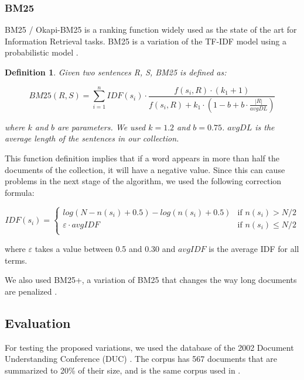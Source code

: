 \documentclass{llncs}
\newtheorem{definicion}{Definition}
\begin{document}
\subsubsection{BM25}
BM25 / Okapi-BM25 is a ranking function widely used as the state of the art for Information Retrieval tasks. BM25 is a variation of the TF-IDF model using a probabilistic model \cite{robertson}.

\begin{definicion}
Given two sentences R, S, BM25 is defined as:

\begin{equation}
BM25(R,S) = \sum_{i=1}^{n} IDF(s_i) \cdot \frac{f(s_i, R) \cdot (k_1 + 1)}{f(s_i, R) + k_1 \cdot (1 - b + b \cdot \frac{|R|}{avgDL})}
\end{equation}

where $k$ and $b$ are parameters. We used $k = 1.2$ and $b = 0.75$. $avgDL$ is the average length of the sentences in our collection.
\end{definicion}

This function definition implies that if a word appears in more than half the documents of the collection, it will have a negative value. Since this can cause problems in the next stage of the algorithm, we used the following correction formula:
                
\begin{equation}
 IDF(s_i) =
  \begin{cases}
       log(N - n(s_i) + 0.5) - log(n(s_i) + 0.5)    & \text{if }  n(s_i) > N/2\\
       \varepsilon \cdot avgIDF                     & \text{if }  n(s_i) \leq N/2\\
  \end{cases}
\end{equation}                
                
where $\varepsilon$ takes a value between 0.5 and 0.30 and $avgIDF$ is the average IDF for all terms.

We also used BM25+, a variation of BM25 that changes the way long documents are penalized \cite{lv}.


\subsection{Evaluation}
For testing the proposed variations, we used the database of the 2002 Document Understanding Conference (DUC) \cite{duc2002-guidelines}. The corpus has 567 documents that are summarized to 20\% of their size, and is the same corpus used in \cite{mihalcea-tarau}. 
\end{document}
